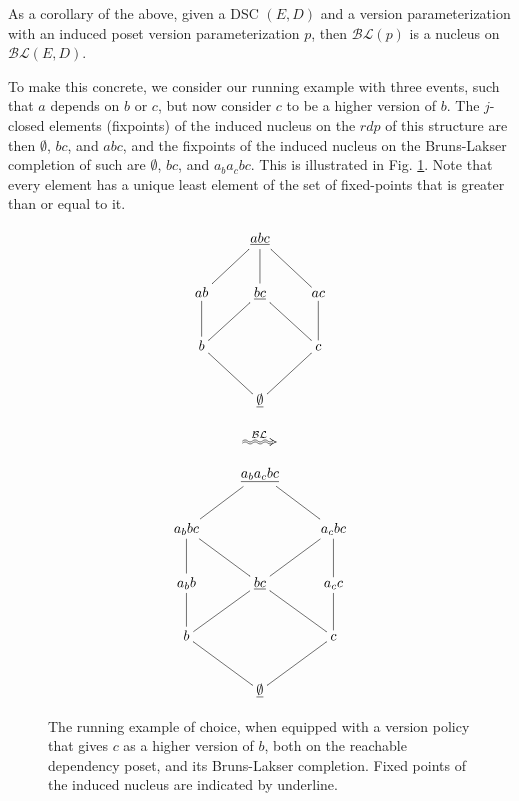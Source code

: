 \documentclass[a4paper,USenglish,cleveref, autoref, thm-restate,authorcolumns]{lipics-v2019}
\newcommand{\BLc}{\mathcal{BL}}
\begin{document}
As a corollary of the above, given a DSC \((E,D)\) and a version parameterization with an induced poset version parameterization \(p\), then \(\BLc(p)\) is a nucleus on \(\BLc(E,D)\).

To make this concrete, we consider our running example with three events, such that \(a\) depends on \(b\) or \(c\), but now consider \(c\) to be a higher version of \(b\). The \(j\)-closed elements (fixpoints) of the induced nucleus on the \(rdp\) of this structure are then \(\emptyset\), \(bc\), and \(abc\), and the fixpoints of the induced nucleus on the Bruns-Lakser completion of such are \(\emptyset\), \(bc\), and \(a_ba_cbc\). This is illustrated in Fig. \ref{Fig4}. Note that every element has a unique least element of the set of fixed-points that is greater than or equal to it.

\begin{figure}
\centering
\begin{minipage}[c]{0.3\textwidth}
\begin{equation*}
    \xymatrix{& \underline{abc} \ar@{-}[dl] \ar@{-}[d] \ar@{-}[dr] & \\
      ab \ar@{-}[d] & \underline{bc} \ar@{-}[dl] \ar@{-}[dr] &
        ac \ar@{-}[d]  \\
        b \ar@{-}[dr] & & c \ar@{-}[dl]         \\
       & \underline{\emptyset} &}
\end{equation*}
\end{minipage}
\begin{minipage}[c]{0.08\textwidth}
  \begin{equation*}
    \xymatrix{\ar@2{~>}[r]^{\BLc} &}
  \end{equation*}
\end{minipage}
\begin{minipage}[c]{0.3\textwidth}
\begin{equation*}
    \xymatrix{& \underline{a_ba_cbc} \ar@{-}[dl]  \ar@{-}[dr] & \\
      a_bbc \ar@{-}[d] \ar@{-}[dr] & &
        a_cbc \ar@{-}[d] \ar@{-}[dl]\\
        a_bb \ar@{-}[d] & \underline{bc} \ar@{-}[dl] \ar@{-}[dr] &
          a_cc \ar@{-}[d] \\
         b \ar@{-}[dr] & & c \ar@{-}[dl] \\
      & \underline{\emptyset} }
\end{equation*}
\end{minipage}
\caption{The running example of choice, when equipped with a version policy that gives \(c\) as a higher version of \(b\), both on the reachable dependency poset, and its Bruns-Lakser completion. Fixed points of the induced nucleus are indicated by underline.}
\label{Fig4}
\end{figure}
\end{document}

